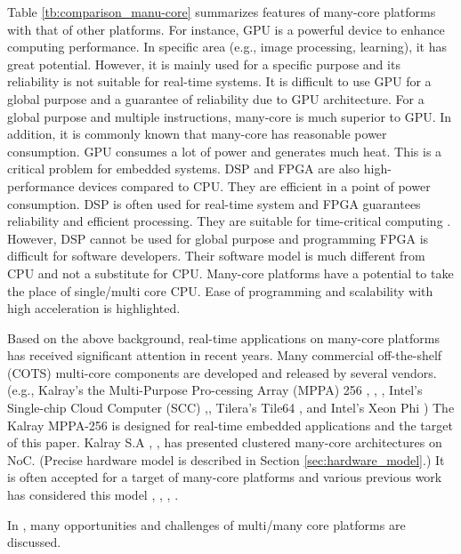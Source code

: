 \documentclass{sig-alternate-05-2015}
\begin{document}
Table \ref{tb:comparison_manu-core} summarizes features of many-core platforms with that of other platforms.
For instance, GPU is a powerful device to enhance computing performance.
In specific area (e.g., image processing, learning), it has great potential.
However, it is mainly used for a specific purpose and its reliability is not suitable for real-time systems.
It is difficult to use GPU for a global purpose and a guarantee of reliability due to GPU architecture.
For a global purpose and multiple instructions, many-core is much superior to GPU.
In addition, it is commonly known that many-core has reasonable power consumption.
GPU consumes a lot of power and generates much heat.
This is a critical problem for embedded systems.
DSP and FPGA are also high-performance devices compared to CPU.
They are efficient in a point of power consumption.
DSP is often used for real-time system and FPGA guarantees reliability and efficient processing.
They are suitable for time-critical computing \cite{de2015kalray}.
However, DSP cannot be used for global purpose and programming FPGA is difficult for software developers.
Their software model is much different from CPU and not a substitute for CPU.
Many-core platforms have a potential to take the place of single/multi core CPU.
Ease of programming and scalability with high acceleration is highlighted.

Based on the above background, real-time applications on many-core platforms has received significant attention in recent years.
Many commercial off-the-shelf (COTS) multi-core components are developed and released by several vendors.
(e.g., Kalray's the Multi-Purpose Pro-cessing Array (MPPA) 256 \cite{de2013distributed}, \cite{de2013clustered}, \cite{de2014time},
Intel's Single-chip Cloud Computer (SCC) \cite{intel2015scc},\cite{baron2010single}, Tilera's Tile64 \cite{tilera2015tile64}, and
Intel's Xeon Phi \cite{chrysos2014intel} \cite{chrysos2012intel})
The Kalray MPPA-256 is designed for real-time embedded applications and the target of this paper.
Kalray S.A \cite{de2013distributed}, \cite{de2013clustered}, \cite{de2014time} has presented clustered many-core architectures on NoC.
(Precise hardware model is described in Section \ref{sec:hardware_model}.)
It is often accepted for a target of many-core platforms and various previous work has considered this model \cite{perret2016temporal}, \cite{becker2016contention}, \cite{carle2014static}, \cite{perret2016mapping}.


In \cite{saidi2015shift}, many opportunities and challenges of multi/many core platforms are discussed.
\end{document}
